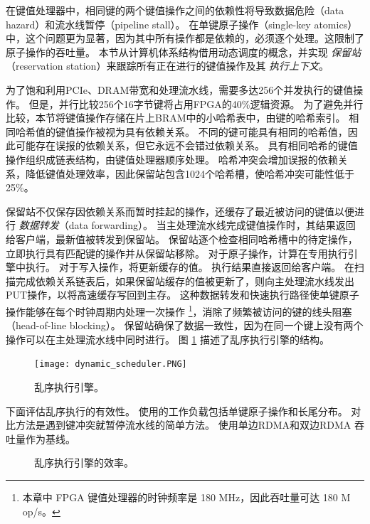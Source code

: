 在键值处理器中，相同键的两个键值操作之间的依赖性将导致数据危险（data hazard）和流水线暂停（pipeline stall）。
在单键原子操作（single-key atomics）中，这个问题更为显著，因为其中所有操作都是依赖的，必须逐个处理。这限制了原子操作的吞吐量。
本节从计算机体系结构借用动态调度的概念，并实现 \textit {保留站}（reservation station）来跟踪所有正在进行的键值操作及其 \textit {执行上下文}。

为了饱和利用PCIe、DRAM带宽和处理流水线，需要多达256个并发执行的键值操作。
但是，并行比较256个16字节键将占用FPGA的40\%逻辑资源。
为了避免并行比较，本节将键值操作存储在片上BRAM中的小哈希表中，由键的哈希索引。
相同哈希值的键值操作被视为具有依赖关系。
不同的键可能具有相同的哈希值，因此可能存在误报的依赖关系，但它永远不会错过依赖关系。
具有相同哈希的键值操作组织成链表结构，由键值处理器顺序处理。
哈希冲突会增加误报的依赖关系，降低键值处理效率，因此保留站包含1024个哈希槽，使哈希冲突可能性低于25\%。

保留站不仅保存因依赖关系而暂时挂起的操作，还缓存了最近被访问的键值以便进行 \textit {数据转发}（data forwarding）。
当主处理流水线完成键值操作时，其结果返回给客户端，最新值被转发到保留站。
保留站逐个检查相同哈希槽中的待定操作，立即执行具有匹配键的操作并从保留站移除。
对于原子操作，计算在专用执行引擎中执行。
对于写入操作，将更新缓存的值。
执行结果直接返回给客户端。
在扫描完成依赖关系链表后，如果保留站缓存的值被更新了，则向主处理流水线发出PUT操作，以将高速缓存写回到主存。
这种数据转发和快速执行路径使单键原子操作能够在每个时钟周期内处理一次操作 \footnote{本章中 FPGA 键值处理器的时钟频率是 180 MHz，因此吞吐量可达 180 M op/s。}，消除了频繁被访问的键的线头阻塞（head-of-line blocking）。
保留站确保了数据一致性，因为在同一个键上没有两个操作可以在主处理流水线中同时进行。
图 \ref{kvdirect:fig:ooo-mem-access} 描述了乱序执行引擎的结构。

\begin{figure}[htbp]
	\centering
	\texttt{[image: dynamic\_scheduler.PNG]}
	\caption{乱序执行引擎。}
	\label{kvdirect:fig:ooo-mem-access}
\end{figure}


\label{kvdirect:sec:ooo-eval}

下面评估乱序执行的有效性。
使用的工作负载包括单键原子操作和长尾分布。
对比方法是遇到键冲突就暂停流水线的简单方法。
使用单边RDMA和双边RDMA \cite {kalia2016design} 吞吐量作为基线。


\begin{figure}[htbp]
	\centering
	\caption{乱序执行引擎的效率。}
	\label{kvdirect:fig:ooo-eval}
\end{figure}

